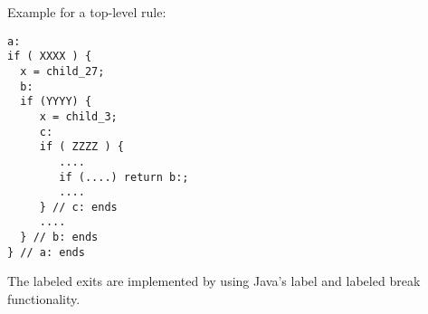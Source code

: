 Example for a top-level rule:

\begin{verbatim}
a:
if ( XXXX ) {
  x = child_27;
  b:
  if (YYYY) {
     x = child_3;
     c:
     if ( ZZZZ ) {
        ....
        if (....) return b:;
        ....
     } // c: ends
     ....
  } // b: ends
} // a: ends
\end{verbatim}

The labeled exits are implemented by using Java's label and labeled break functionality.




